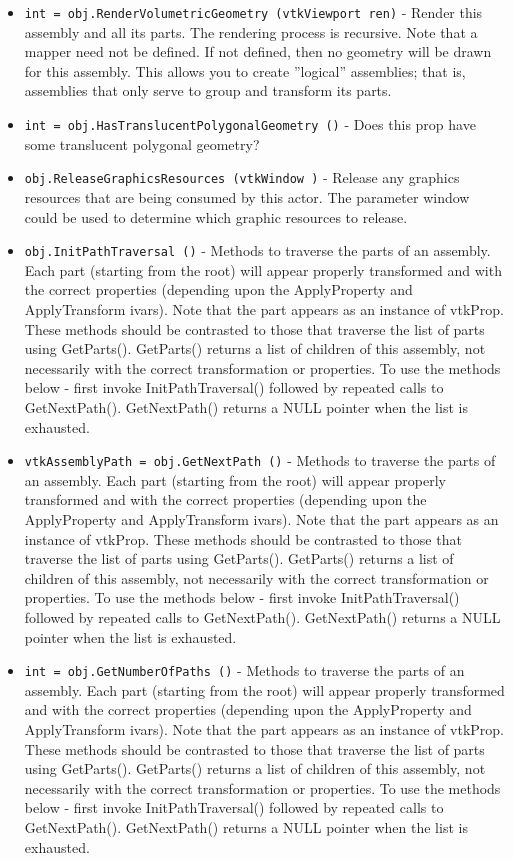 \begin{itemize}
\item  \verb|int = obj.RenderVolumetricGeometry (vtkViewport ren)| -  Render this assembly and all its parts. 
 The rendering process is recursive.
 Note that a mapper need not be defined. If not defined, then no geometry 
 will be drawn for this assembly. This allows you to create ''logical''
 assemblies; that is, assemblies that only serve to group and transform
 its parts.

\item  \verb|int = obj.HasTranslucentPolygonalGeometry ()| -  Does this prop have some translucent polygonal geometry?

\item  \verb|obj.ReleaseGraphicsResources (vtkWindow )| -  Release any graphics resources that are being consumed by this actor.
 The parameter window could be used to determine which graphic
 resources to release.

\item  \verb|obj.InitPathTraversal ()| -  Methods to traverse the parts of an assembly. Each part (starting from
 the root) will appear properly transformed and with the correct
 properties (depending upon the ApplyProperty and ApplyTransform ivars).
 Note that the part appears as an instance of vtkProp. These methods
 should be contrasted to those that traverse the list of parts using
 GetParts().  GetParts() returns a list of children of this assembly, not
 necessarily with the correct transformation or properties. To use the
 methods below - first invoke InitPathTraversal() followed by repeated
 calls to GetNextPath().  GetNextPath() returns a NULL pointer when the
 list is exhausted.

\item  \verb|vtkAssemblyPath = obj.GetNextPath ()| -  Methods to traverse the parts of an assembly. Each part (starting from
 the root) will appear properly transformed and with the correct
 properties (depending upon the ApplyProperty and ApplyTransform ivars).
 Note that the part appears as an instance of vtkProp. These methods
 should be contrasted to those that traverse the list of parts using
 GetParts().  GetParts() returns a list of children of this assembly, not
 necessarily with the correct transformation or properties. To use the
 methods below - first invoke InitPathTraversal() followed by repeated
 calls to GetNextPath().  GetNextPath() returns a NULL pointer when the
 list is exhausted.

\item  \verb|int = obj.GetNumberOfPaths ()| -  Methods to traverse the parts of an assembly. Each part (starting from
 the root) will appear properly transformed and with the correct
 properties (depending upon the ApplyProperty and ApplyTransform ivars).
 Note that the part appears as an instance of vtkProp. These methods
 should be contrasted to those that traverse the list of parts using
 GetParts().  GetParts() returns a list of children of this assembly, not
 necessarily with the correct transformation or properties. To use the
 methods below - first invoke InitPathTraversal() followed by repeated
 calls to GetNextPath().  GetNextPath() returns a NULL pointer when the
 list is exhausted.


\end{itemize}
